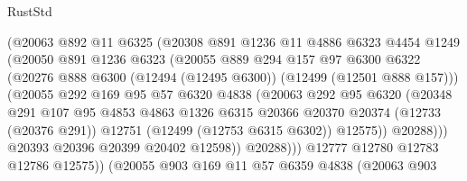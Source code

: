 \begin{lexlean}{RustStd}
\begin{coremodule}
{\begin{coremodule}
{{{{{{{{{{{{{{{{{{{{{{{{{{{{{{{{{{{{{{{{{{{{{{{{{{{{{{{{{{{{{{{{{{{{{{{{{{{{{{{{                      (@20063
                        @892
                        @11
                        @6325
                        (@20308
                          @891
                          @1236
                          @11
                          @4886
                          @6323
                          @4454
                          @1249
                          (@20050
                            @891
                            @1236
                            @6323
                            (@20055
                              @889
                              @294
                              @157
                              @97
                              @6300
                              @6322
                              (@20276
                                @888
                                @6300
                                (@12494 (@12495 @6300))
                                (@12499 (@12501 @888 @157)))
                              (@20055
                                @292
                                @169
                                @95
                                @57
                                @6320
                                @4838
                                (@20063
                                  @292
                                  @95
                                  @6320
                                  (@20348
                                    @291
                                    @107
                                    @95
                                    @4853
                                    @4863
                                    @1326
                                    @6315
                                    @20366
                                    @20370
                                    @20374
                                    (@12733 (@20376 @291))
                                    @12751
                                    (@12499 (@12753 @6315 @6302))
                                    @12575))
                                @20288)))
                          @20393
                          @20396
                          @20399
                          @20402
                          @12598))
                      @20288)))
                @12777
                @12780
                @12783
                @12786
                @12575))
            (@20055
              @903
              @169
              @11
              @57
              @6359
              @4838
              (@20063
                @903
}}}}}}}}}}}}}}}}}}}}}}}}}}}}}}}}}}}}}}}}}}}}}}}}}}}}}}}}}}}}}}}}}}}}}}}}}}}}}}}}
\end{coremodule}}
\end{coremodule}
\end{lexlean}
